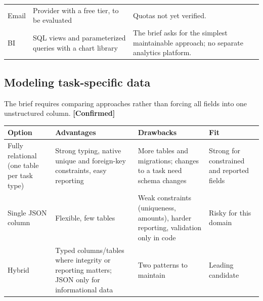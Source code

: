 \documentclass[11pt,a4paper]{article}
\newcommand{\tagconf}{\textcolor{green!45!black}{\textbf{[Confirmed]}}}
\begin{document}
\begin{longtable}{@{}L{2.4cm}L{3.6cm}L{9.8cm}@{}}
	Email              & Provider with a free tier, to be evaluated                                                             & Quotas not yet verified.                                                                                                                                                                                                                                                                                                                                                                                                                                                                                               \\
	BI                 & SQL views and parameterized queries with a chart library                                               & The brief asks for the simplest maintainable approach; no separate analytics platform.                                                                                                                                                                                                                                                                                                                                                                                                                                 \\
	\bottomrule
\end{longtable}

\subsection{Modeling task-specific data}

The brief requires comparing approaches rather than forcing all fields into one unstructured column. \tagconf{}

\begin{longtable}{@{}L{3.0cm}L{4.1cm}L{4.1cm}L{4.6cm}@{}}
	\toprule
	\textbf{Option}                            & \textbf{Advantages}                                                                         & \textbf{Drawbacks}                                                                & \textbf{Fit}                               \\
	\midrule
	\endhead
	Fully relational (one table per task type) & Strong typing, native unique and foreign-key constraints, easy reporting                    & More tables and migrations; changes to a task need schema changes                 & Strong for constrained and reported fields \\
	Single JSON column                         & Flexible, few tables                                                                        & Weak constraints (uniqueness, amounts), harder reporting, validation only in code & Risky for this domain                      \\
	Hybrid                                     & Typed columns/tables where integrity or reporting matters; JSON only for informational data & Two patterns to maintain                                                          & Leading candidate                          \\
	\bottomrule
\end{longtable}
\end{document}
